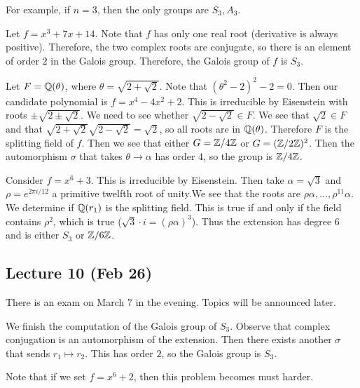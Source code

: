 \message{ !name(notes.tex)}\documentclass[10pt, twoside]{article}
\begin{document}
        For example, if $n = 3$, then the only groups are $S_3,A_3$.
        \begin{exm}
            Let $f = x^3 + 7x+14$. Note that $f$ has only one real root (derivative is always positive). Therefore, the two complex roots are conjugate, so there is an element of order $2$ in the Galois group. Therefore, the Galois group of $f$ is $S_3$.
        \end{exm}

        \begin{exm}
            Let $F = \mathbb{Q}(\theta)$, where $\theta = \sqrt{2+\sqrt{2}}$. Note that $(\theta^2-2)^2 - 2 = 0$. Then our candidate polynomial is $f = x^4 - 4x^2+2$. This is irreducible by Eisenstein with roots $\pm \sqrt{2 \pm \sqrt{2}}$. We need to see whether $\sqrt{2-\sqrt{2}} \in F$. We see that $\sqrt{2} \in F$ and that $\sqrt{2+\sqrt{2}}\sqrt{2-\sqrt{2}} = \sqrt{2}$, so all roots are in $\mathbb{Q}(\theta)$. Therefore $F$ is the splitting field of $f$. Then we see that either $G = \mathbb{Z}/4\mathbb{Z}$ or $G = (\mathbb{Z}/2\mathbb{Z})^2$. Then the automorphism $\sigma$ that takes $\theta \to \alpha$ has order $4$, so the group is $\mathbb{Z}/4\mathbb{Z}$.
        \end{exm}

        \begin{exm}
            Consider $f = x^6+3$. This is irreducible by Eisenstein. Then take $\alpha = \sqrt{3}$ and $\rho = e^{2 \pi i /12}$ a primitive twelfth root of unity.We see that the roots are $\rho\alpha, \ldots, \rho^{11}\alpha$. We determine if $\mathbb{Q}(r_1)$ is the splitting field. This is true if and only if the field contains $\rho^2$, which is true ($\sqrt{3} \cdot i = (\rho\alpha)^3$). Thus the extension has degree $6$ and is either $S_3$ or $\mathbb{Z}/6\mathbb{Z}$.
        \end{exm}

        \subsection{Lecture 10 (Feb 26)}
        There is an exam on March $7$ in the evening. Topics will be announced later.

        We finish the computation of the Galois group of $S_3$. Observe that complex conjugation is an automorphism of the extension. Then there exists another $\sigma$ that sends $r_1 \mapsto r_2$. This has order $2$, so the Galois group is $S_3$.

        Note that if we set $f = x^6+2$, then this problem becomes must harder.
\end{document}
